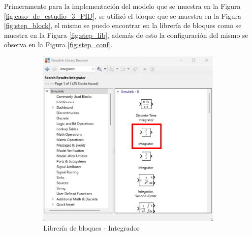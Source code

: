 Primeramente para la implementación del modelo que se muestra en la Figura \ref{fig:caso_de_estudio_3_PID}, se utilizó el bloque que se muestra en la Figura \ref{fig:step_block}, el mismo se puedo encontrar en la librería de bloques como se muestra en la Figura \ref{fig:step_lib}, además de esto la configuración del mismo se observa en la Figura \ref{fig:step_conf}.

\begin{figure}[htbp]
    \centering
    \begin{subfigure}[b]{0.35\textwidth}
        \centering
        \includegraphics[width=\textwidth]{fig/Capitulo5/Caso_de_estudio_PID/lib_integrator.pdf}
        \caption{Librería de bloques - Integrador}
        \label{fig:int_PID_lib}
    \end{subfigure}
    \hfill
    \begin{subfigure}[b]{0.45\textwidth}
        \centering

\end{subfigure}
\end{figure}
